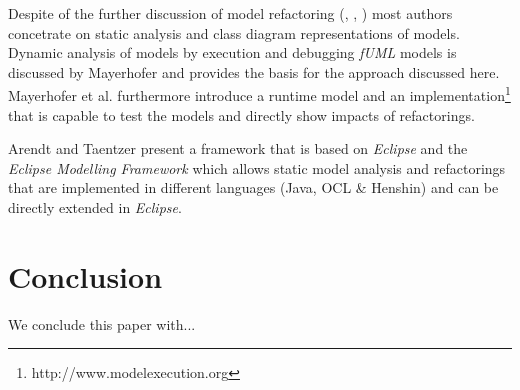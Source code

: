 \documentclass{llncs}
\begin{document}

Despite of the further discussion of model refactoring (\cite{DBLP:conf/uml/CorreaW04}, \cite{DBLP:conf/ershov/BaarM06},
\cite{DBLP:journals/ase/ArendtT13}) most authors concetrate on static analysis and class diagram representations of
models. Dynamic analysis of models by execution and debugging \textit{fUML} models is discussed by Mayerhofer
\cite{DBLP:conf/icse/Mayerhofer12} and provides the basis for the approach discussed here. Mayerhofer et al.
\cite{DBLP:conf/models/MayerhoferLK12} furthermore introduce a runtime model and an
implementation\footnote{http://www.modelexecution.org} that is capable to test the models and directly show impacts of
refactorings.


Arendt and Taentzer \cite{DBLP:journals/ase/ArendtT13} present a framework that is based on \textit{Eclipse} and the
\textit{Eclipse Modelling Framework} which allows static model analysis and refactorings that are implemented in
different languages (Java, OCL \& Henshin) and can be directly extended in \textit{Eclipse}.


\section{Conclusion}
We conclude this paper with...

\newpage


\end{document}
